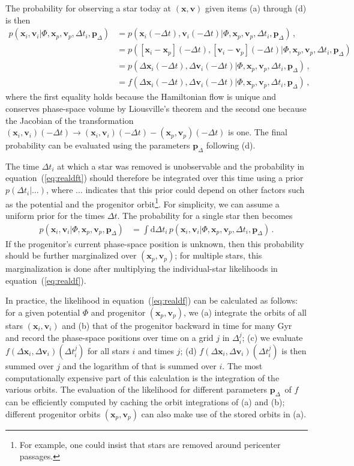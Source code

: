 \documentclass[12pt,preprint]{aastex}
\newcommand{\dd}{\mathrm{d}}
\newcommand{\eqnname}{equation}
\renewcommand{\vec}[1]{\ensuremath{\mathbf{#1}}}
\newcommand{\vecx}{\ensuremath{\vec{x}}}
\newcommand{\vecv}{\ensuremath{\vec{v}}}
\newcommand{\paramsdiff}{\ensuremath{\vec{p}_\Delta}}
\begin{document}
The probability for observing a star today at $(\vecx,\vecv)$ given
items (a) through (d) is then
\begin{align}\label{eq:realdft}
  p(\vecx_i,\vecv_i | \Phi,\vecx_p,\vecv_p,\Delta t_i,\paramsdiff) 
  & = p(\vecx_i(-\Delta t),\vecv_i(-\Delta t) | \Phi,\vecx_p,\vecv_p,\Delta t_i,\paramsdiff) \,,\nonumber\\
  & = p([\vecx_i-\vecx_p](-\Delta t),[\vecv_i-\vecv_p](-\Delta t) | \Phi,\vecx_p,\vecv_p,\Delta t_i,\paramsdiff) \,\nonumber\\
  & = p(\Delta\vecx_i(-\Delta t),\Delta\vecv_i(-\Delta t) | \Phi,\vecx_p,\vecv_p,\Delta t_i,\paramsdiff)\,,\\
  & = f(\Delta\vecx_i(-\Delta t),\Delta\vecv_i(-\Delta t) | \Phi,\vecx_p,\vecv_p,\Delta t_i,\paramsdiff)\, ,\nonumber
\end{align}
where the first equality holds because the Hamiltonian flow is unique
and conserves phase-space volume by Liousville's theorem and the
second one because the Jacobian of the transformation
$(\vecx_i,\vecv_i)(-\Delta t) \rightarrow (\vecx_i,\vecv_i)(-\Delta t)
- (\vecx_p,\vecv_p)(-\Delta t)$ is one. The final probability can be
evaluated using the parameters $\paramsdiff$ following (d).

The time $\Delta t_i$ at which a star was removed is unobservable and
the probability in \eqnname~(\ref{eq:realdft}) should therefore be
integrated over this time using a prior $p(\Delta t_i|\ldots)$, where
$\ldots$ indicates that this prior could depend on other factors such
as the potential and the progenitor orbit\footnote{For example, one
  could insist that stars are removed around pericenter
  passages.}. For simplicity, we can assume a uniform prior for the
times $\Delta t$. The probability for a single star then becomes
\begin{align}\label{eq:realdf}
  p(\vecx_i,\vecv_i | \Phi,\vecx_p,\vecv_p,\paramsdiff) & = \int \dd
  \Delta t_i \,p(\vecx_i,\vecv_i | \Phi,\vecx_p,\vecv_p,\Delta t_i,
  \paramsdiff)\,.
\end{align}
If the progenitor's current phase-space position is unknown, then this
probability should be further marginalized over $(\vecx_p,\vecv_p)$;
for multiple stars, this marginalization is done after multiplying the
individual-star likelihoods in \eqnname~(\ref{eq:realdf}).

In practice, the likelihood in \eqnname~(\ref{eq:realdf}) can be
calculated as follows: for a given potential $\Phi$ and progenitor
$(\vecx_p,\vecv_p)$, we (a) integrate the orbits of all stars
$(\vecx_i,\vecv_i)$ and (b) that of the progenitor backward in time for
many Gyr and record the phase-space positions over time on a grid $j$
in $\Delta^j_i$; (c) we evaluate $f(\Delta \vecx_i,\Delta
\vecv_i)(\Delta t^j_i)$ for all stars $i$ and times $j$; (d) $f(\Delta
\vecx_i,\Delta \vecv_i)(\Delta t^j_i)$ is then summed over $j$ and the
logarithm of that is summed over $i$. The most computationally
expensive part of this calculation is the integration of the various
orbits. The evaluation of the likelihood for different parameters
\paramsdiff\ of $f$ can be efficiently computed by caching the orbit
integrations of (a) and (b); different progenitor orbits
$(\vecx_p,\vecv_p)$ can also make use of the stored orbits in (a).
\end{document}
